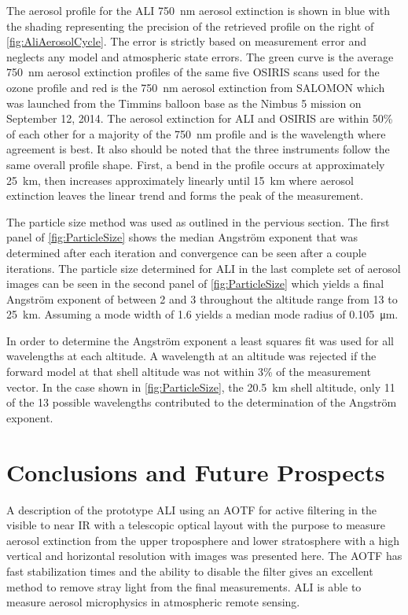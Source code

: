 \documentclass[12pt]{article}
\begin{document}
The aerosol profile for the ALI 750~nm aerosol extinction is shown in blue with the shading representing the precision of the retrieved profile on the right of \autoref{fig:AliAerosolCycle}. The error is strictly based on measurement error and neglects any model and atmospheric state errors. The green curve is the average 750~nm aerosol extinction profiles of the same five OSIRIS scans used for the ozone profile and red is the 750~nm aerosol extinction from SALOMON \citep{Berthet2002} which was launched from the Timmins balloon base as the Nimbus 5 mission on September 12, 2014. The aerosol extinction for ALI and OSIRIS are within 50\% of each other for a majority of the 750~nm profile and is the wavelength where agreement is best. It also should be noted that the three instruments follow the same overall profile shape.  First, a bend in the profile occurs at approximately 25~km, then increases approximately linearly until 15~km where aerosol extinction leaves the linear trend and forms the peak of the measurement. %

The particle size method was used as outlined in the pervious section. The first panel of \autoref{fig:ParticleSize} shows the median Angstr\"{o}m exponent that was determined after each iteration and convergence can be seen after a couple iterations. The particle size determined for ALI in the last complete set of aerosol images can be seen in the second panel of \autoref{fig:ParticleSize} which yields a final Angstr\"{o}m exponent of between 2 and 3 throughout the altitude range from 13 to 25~km. Assuming a mode width of 1.6 yields a median mode radius of 0.105~\si{\micro\metre}.

In order to determine the Angstr\"{o}m exponent a least squares fit was used for all wavelengths at each altitude. A wavelength at an altitude was rejected if the forward model at that shell altitude was not within 3\% of the measurement vector. In the case shown in \autoref{fig:ParticleSize}, the 20.5~km shell altitude, only 11 of the 13 possible wavelengths contributed to the determination of the Angstr\"{o}m exponent.

\section{Conclusions and Future Prospects}

A description of the prototype ALI using an AOTF for active filtering in the visible to near IR with a telescopic optical layout with the purpose to measure aerosol extinction from the upper troposphere and lower stratosphere with a high vertical and horizontal resolution with images was presented here. The AOTF has fast stabilization times and the ability to disable the filter gives an excellent method to remove stray light from the final measurements. ALI is able to measure aerosol microphysics in atmospheric remote sensing.
\end{document}
